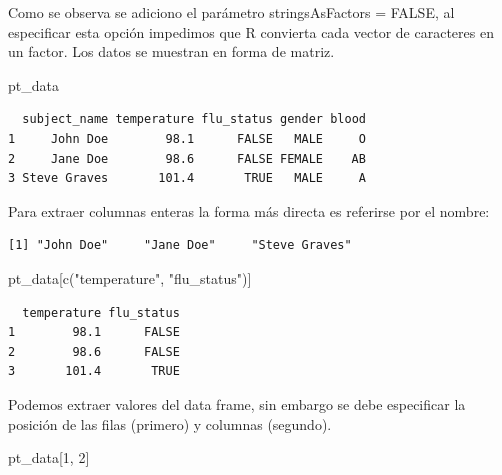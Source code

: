 \documentclass[
  letterpaper,
  DIV=11,
  numbers=noendperiod]{scrartcl}
\newenvironment{Shaded}{\begin{snugshade}}{\end{snugshade}}
\newcommand{\DecValTok}[1]{\textcolor[rgb]{0.68,0.00,0.00}{#1}}
\newcommand{\FunctionTok}[1]{\textcolor[rgb]{0.28,0.35,0.67}{#1}}
\newcommand{\NormalTok}[1]{\textcolor[rgb]{0.00,0.23,0.31}{#1}}
\newcommand{\SpecialCharTok}[1]{\textcolor[rgb]{0.37,0.37,0.37}{#1}}
\newcommand{\StringTok}[1]{\textcolor[rgb]{0.13,0.47,0.30}{#1}}
\begin{document}
Como se observa se adiciono el parámetro stringsAsFactors = FALSE, al
especificar esta opción impedimos que R convierta cada vector de
caracteres en un factor. Los datos se muestran en forma de matriz.

\begin{Shaded}
\begin{Highlighting}[]
\NormalTok{pt\_data}
\end{Highlighting}
\end{Shaded}

\begin{verbatim}
  subject_name temperature flu_status gender blood
1     John Doe        98.1      FALSE   MALE     O
2     Jane Doe        98.6      FALSE FEMALE    AB
3 Steve Graves       101.4       TRUE   MALE     A
\end{verbatim}

Para extraer columnas enteras la forma más directa es referirse por el
nombre:

\begin{Shaded}
\end{Shaded}

\begin{verbatim}
[1] "John Doe"     "Jane Doe"     "Steve Graves"
\end{verbatim}

\begin{Shaded}
\begin{Highlighting}[]
\NormalTok{ pt\_data[}\FunctionTok{c}\NormalTok{(}\StringTok{"temperature"}\NormalTok{, }\StringTok{"flu\_status"}\NormalTok{)]}
\end{Highlighting}
\end{Shaded}

\begin{verbatim}
  temperature flu_status
1        98.1      FALSE
2        98.6      FALSE
3       101.4       TRUE
\end{verbatim}

Podemos extraer valores del data frame, sin embargo se debe especificar
la posición de las filas (primero) y columnas (segundo).

\begin{Shaded}
\begin{Highlighting}[]
\NormalTok{pt\_data[}\DecValTok{1}\NormalTok{, }\DecValTok{2}\NormalTok{]}
\end{Highlighting}
\end{Shaded}
\end{document}
